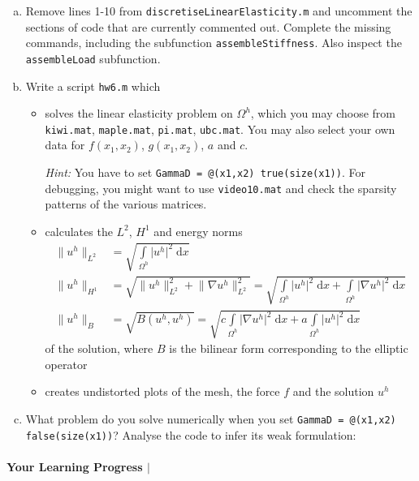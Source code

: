 \documentclass[10pt,letterpaper]{scrartcl}
\newcommand{\dx}{\;\mathrm{d}x}
\begin{document}
\begin{enumerate}[(a)]
\item Remove lines 1-10 from \texttt{discretiseLinearElasticity.m} and uncomment the sections of code that are currently commented out. Complete the missing commands, including the subfunction \texttt{assembleStiffness}. Also inspect the \texttt{assembleLoad} subfunction.
\item Write a script \texttt{hw6.m} which
\begin{itemize}
\item solves the linear elasticity problem on $\Omega^h$, which you may choose from \texttt{kiwi.mat}, \texttt{maple.mat}, \texttt{pi.mat}, \texttt{ubc.mat}. You may also select your own data for $f(x_1,x_2)$, $g(x_1,x_2)$, $a$ and $c$.

\emph{Hint:} You have to set \texttt{GammaD = @(x1,x2) true(size(x1))}. For debugging, you might want to use \texttt{video10.mat} and check the sparsity patterns of the various matrices.
\item calculates the $L^2$, $H^1$ and energy norms
\begin{align*}
\lVert u^h \rVert_{L^2} &= \sqrt{\int\limits_{\Omega^h} \lvert u^h \rvert^2 \dx}\\
\lVert u^h \rVert_{H^1} &= \sqrt{\lVert u^h \rVert_{L^2}^2 + \lVert \nabla u^h \rVert_{L^2}^2} = \sqrt{\int\limits_{\Omega^h} \lvert u^h \rvert^2 \dx + \int\limits_{\Omega^h} \lvert \nabla u^h \rvert^2 \dx}\\
\lVert u^h \rVert_{B} &= \sqrt{B(u^h,u^h)} = \sqrt{c\int\limits_{\Omega^h} \lvert \nabla u^h \rvert^2 \dx + a \int\limits_{\Omega^h} \lvert u^h \rvert^2 \dx}
\end{align*}
of the solution, where $B$ is the bilinear form corresponding to the elliptic operator
\item creates undistorted plots of the mesh, the force $f$ and the solution $u^h$
\end{itemize}
\item What problem do you solve numerically when you set \texttt{GammaD = @(x1,x2) false(size(x1))}? Analyse the code to infer its weak formulation:
\end{enumerate}

\vfill

\paragraph*{Your Learning Progress $\vert$ \faFilePdfO}
\end{document}
